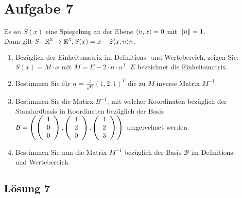 \documentclass[main.tex]{subfiles}
\begin{document}
\section{Aufgabe 7}
Es sei $S(x)$ eine Spiegelung an der Ebene $\scalarprod{n,x} = 0$ mit $\norm{n} = 1$.\\
Dann gilt $S:\mathbb{R}^3 \to \mathbb{R}^3, S(x) = x-2 \scalarprod{x,n} n$.

\begin{enumerate}
    \item Bezüglich der Einheitsmatrix im Definitions- und Wertebereich, zeigen Sie:
    $S(x) = M\cdot x$ mit $M = E-2\cdot n \cdot n^T$. $E$ bezeichnet die Einheitsmatrix. 
    \item Bestimmen Sie für $n = \frac{1}{\sqrt{6}} (1, 2, 1)^T$ die zu $M$ inverse Matrix $M^{-1}$.
    \item Bestimmen Sie die Matirx $B^{-1}$, mit welcher Koordinaten bezüglich der Standardbasis in Koordinaten bezüglich der Basis
    $\mathcal{B} = \left( \eqmatrix{c}{1 \\ 0 \\ 0}, \eqmatrix{c}{1 \\ 2 \\ 0}, \eqmatrix{c}{1 \\ 2 \\ 3} \right)$ umgerechnet werden.
    \item Bestimmen Sie nun die Matrix $M^{-1}$ bezüglich der Basis $\mathcal{B}$ im Definitions- und Wertebereich.
\end{enumerate}

\subsection{Lösung 7}
\end{document}
